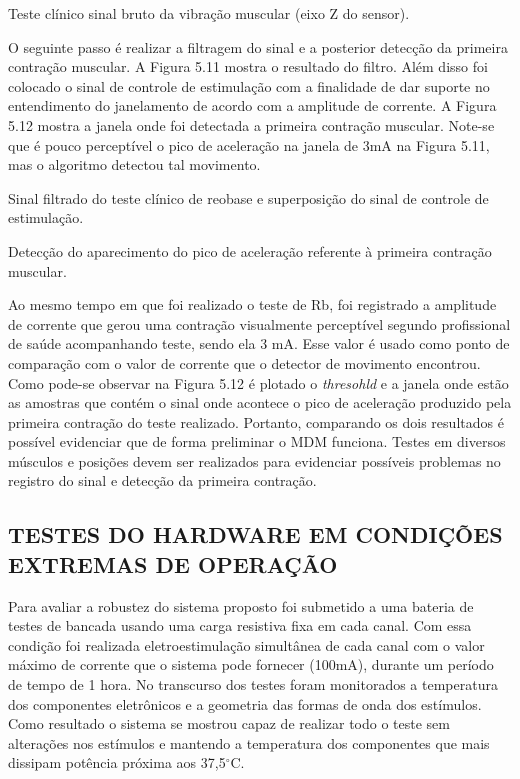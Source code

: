     Teste  clínico  sinal  bruto  da  vibração  muscular  (eixo  Z  do  sensor). 
    
    O  seguinte  passo  é  realizar  a  filtragem  do  sinal  e  a  posterior  detecção  da  primeira  contração  muscular.  A  Figura  5.11  mostra  o  resultado  do  filtro.  Além  disso  foi  colocado  o  sinal  de  controle  de  estimulação  com  a  finalidade  de  dar  suporte  no  entendimento  do  janelamento  de  acordo  com  a amplitude  de  corrente.  A  Figura  5.12  mostra  a  janela  onde  foi  detectada  a  primeira  contração  muscular.  Note-se  que  é  pouco  perceptível  o  pico  de  aceleração  na  janela  de  3mA  na  Figura  5.11,  mas  o  algoritmo  detectou  tal  movimento. 
    
      
       Sinal  filtrado  do  teste  clínico  de  reobase  e  superposição  do  sinal  de  controle  de  estimulação.
       
       Detecção  do  aparecimento  do  pico  de  aceleração  referente  à  primeira  contração  muscular.
       
       Ao  mesmo  tempo  em  que  foi  realizado  o  teste  de  Rb,  foi  registrado  a  amplitude  de  corrente  que  gerou  uma  contração  visualmente  perceptível  segundo  profissional  de  saúde  acompanhando  teste,  sendo  ela  3  mA.  Esse  valor  é  usado  como  ponto  de  comparação  com  o  valor  de  corrente  que  o  detector  de  movimento  encontrou.  Como  pode-se  observar  na  Figura  5.12  é  plotado  o  \textit{thresohld}  e  a  janela  onde  estão  as  amostras  que  contém  o  sinal  onde  acontece  o  pico  de  aceleração  produzido  pela  primeira  contração  do  teste  realizado.  Portanto,  comparando  os  dois  resultados  é  possível  evidenciar  que  de  forma  preliminar  o  \acrshort{MDM}  funciona.  Testes  em  diversos  músculos  e  posições  devem  ser  realizados  para  evidenciar  possíveis  problemas  no  registro  do  sinal  e  detecção  da  primeira  contração.
       
       
      \subsection{TESTES  DO  HARDWARE  EM  CONDIÇÕES  EXTREMAS  DE  OPERAÇÃO}
       
       Para  avaliar  a  robustez  do  sistema  proposto  foi  submetido  a  uma  bateria  de  testes  de  bancada  usando  uma  carga  resistiva  fixa  em  cada  canal.  Com  essa  condição  foi  realizada  eletroestimulação  simultânea  de  cada  canal  com  o  valor  máximo  de  corrente  que  o  sistema  pode  fornecer  (100mA),  durante  um  período  de  tempo  de 1 hora.  No  transcurso  dos  testes  foram  monitorados  a  temperatura  dos  componentes  eletrônicos  e  a  geometria  das  formas  de  onda  dos  estímulos.  Como  resultado  o  sistema  se  mostrou  capaz  de  realizar  todo  o  teste  sem  alterações  nos  estímulos  e  mantendo  a  temperatura  dos  componentes  que  mais  dissipam  potência  próxima  aos  37,5$^{\circ}$C.
       
